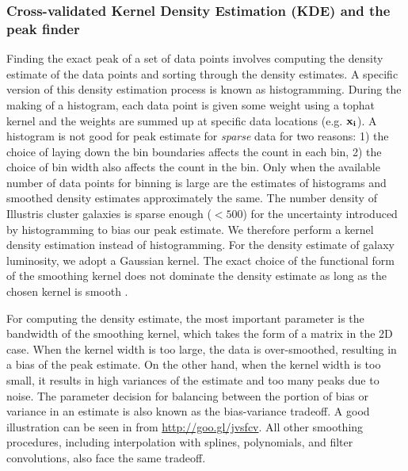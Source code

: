\documentclass[usenatbib]{mn2e}
\begin{document}
{\subsubsection{Cross-validated Kernel Density Estimation (KDE) and the peak finder} 
\label{subsubsec:KDE}
Finding the exact peak of a set of data points 
involves computing the density estimate of the data points and sorting through
the density estimates. A specific version of this density estimation process is
known as histogramming. During the making of a histogram, each data point is
given some weight using a tophat kernel and the weights are summed up at
specific data locations (e.g. $\bf{x}_i$). 
A histogram is not good for peak estimate for {\it sparse} data for two reasons: 1) the
choice of laying down the bin boundaries affects the count in each bin, 2) the choice of
bin width also affects the count in the bin. Only when the available number of data points
for binning is large are the estimates of histograms and smoothed density
estimates approximately the same. The number density of Illustris cluster galaxies  
is sparse enough ($< 500$) for the uncertainty introduced by histogramming 
to bias our peak estimate. We therefore perform a kernel density estimation
instead of histogramming. 
For the density estimate of galaxy luminosity, 
we adopt a Gaussian kernel. 
The exact choice of the functional form of the smoothing kernel does
not dominate the density estimate as long as the chosen kernel is
smooth \citep{Feigelson2014}. 

For computing the density estimate, the most important parameter  
is the bandwidth of the smoothing kernel, 
which takes the form of a matrix in the 2D case. 
When the kernel width is
too large, the data is over-smoothed, 
resulting in a bias of the peak estimate. On the other hand, when the kernel
width is too small, it results in high variances of the estimate and 
too many peaks due to noise. 
The parameter decision for balancing between the portion of
bias or variance in an estimate is also known as the bias-variance tradeoff. 
A good illustration can be seen in \citealt{Vanderplas2012} from 
\href{http://www.astroml.org/book\_figures/chapter6/fig\_hist\_to\_kernel.html}{http://goo.gl/jvsfcv}.
All other smoothing procedures, including interpolation with splines,
polynomials, and filter convolutions, also face the same tradeoff. 

}
\end{document}
